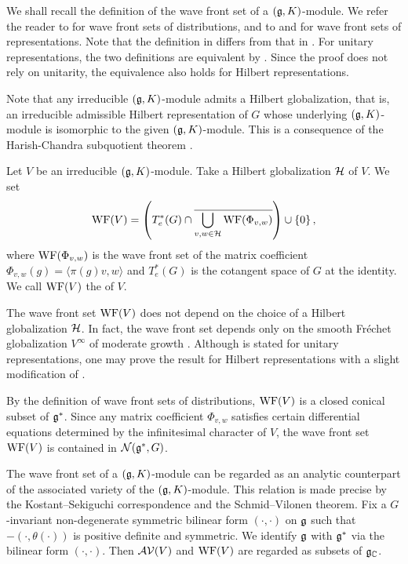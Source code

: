We shall recall the definition of the wave front set of a $(\mathfrak{g}, K)$-module.
We refer the reader to \cite[Chapter VIII]{Ho03} for wave front sets of distributions, and to \cite{Ho81} and \cite{HaHeOl16} for wave front sets of representations.
Note that the definition in \cite{HaHeOl16} differs from that in \cite{Ho81}.
For unitary representations, the two definitions are equivalent by \cite[Proposition 2.4]{HaHeOl16}.
Since the proof does not rely on unitarity, the equivalence also holds for Hilbert representations.

Note that any irreducible $(\mathfrak{g}, K)$-module admits a Hilbert globalization, that is, an irreducible admissible Hilbert representation of $G$ whose underlying $(\mathfrak{g}, K)$-module is isomorphic to the given $(\mathfrak{g}, K)$-module.
This is a consequence of the Harish-Chandra subquotient theorem \cite[Theorem 3.5.6]{Wa88_real_reductive_I}.

\begin{definition}
	Let $V$ be an irreducible $(\mathfrak{g}, K)$-module.
	Take a Hilbert globalization $\mathcal{H}$ of $V$.
	We set
	\begin{align*}
		\mathrm{WF}(V) = \left(T^*_e(G) \cap \overline{\bigcup_{v, w \in \mathcal{H}} \mathrm{WF}(\Phi_{v,w})}\right) \cup \left\{0 \right\},
	\end{align*}
	where $\mathrm{WF}(\Phi_{v,w})$ is the wave front set of the matrix coefficient $\Phi_{v,w}(g) = \langle \pi(g)v, w\rangle$ and $T^*_e(G)$ is the cotangent space of $G$ at the identity.
	We call $\mathrm{WF}(V)$ the  of $V$.
\end{definition}

The wave front set $\mathrm{WF}(V)$ does not depend on the choice of a Hilbert globalization $\mathcal{H}$.
In fact, the wave front set depends only on the smooth Fr\'echet globalization $V^\infty$ of moderate growth \cite[Proposition 3.2]{HaHeOl16}.
Although \cite[Proposition 3.2]{HaHeOl16} is stated for unitary representations, one may prove the result for Hilbert representations with a slight modification of \cite[Lemma 3.3]{HaHeOl16}.

By the definition of wave front sets of distributions, $\mathrm{WF}(V)$ is a closed conical subset of $\mathfrak{g}^*$.
Since any matrix coefficient $\Phi_{v,w}$ satisfies certain differential equations determined by the infinitesimal character of $V$, the wave front set $\mathrm{WF}(V)$ is contained in $\mathcal{N}(\mathfrak{g}^*, G)$.

The wave front set of a $(\mathfrak{g}, K)$-module can be regarded as an analytic counterpart of the associated variety of the $(\mathfrak{g}, K)$-module.
This relation is made precise by the Kostant--Sekiguchi correspondence and the Schmid--Vilonen theorem.
Fix a $G$-invariant non-degenerate symmetric bilinear form $(\cdot, \cdot)$ on $\mathfrak{g}$ such that $-(\cdot, \theta(\cdot))$ is positive definite and symmetric.
We identify $\mathfrak{g}$ with $\mathfrak{g}^*$ via the bilinear form $(\cdot, \cdot)$.
Then $\mathcal{AV}(V)$ and $\mathrm{WF}(V)$ are regarded as subsets of $\mathfrak{g}_{\mathbb{C}}$.

